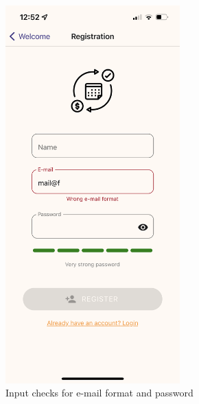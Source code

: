 \documentclass[11pt]{article}
\begin{document}
\begin{figure}[h!]
    \centering
    \begin{minipage}[c]{0.45\textwidth}
        \centering
        \includegraphics[width=0.6\textwidth, clip]{../../assets/smartphone/regFill.PNG}
        \caption{Input checks for e-mail format and password}
        \label{fig:rfill}
    \end{minipage}\hspace{1cm}%
    \begin{minipage}[c]{0.45\textwidth}
        \centering

\end{minipage}
\end{figure}
\end{document}
